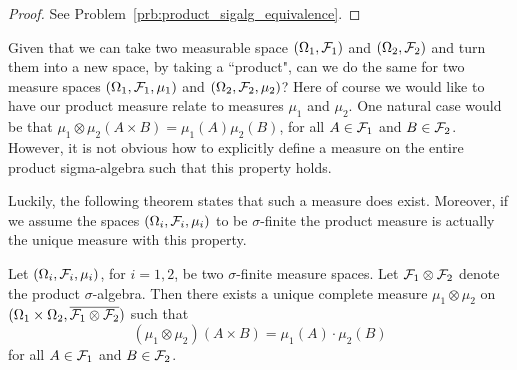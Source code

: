 \begin{proof}
See Problem~\ref{prb:product_sigalg_equivalence}.
\end{proof}


Given that we can take two measurable space $(\Omega_1, \mathcal F_1)$ and $(\Omega_2, \mathcal F_2)$ and turn them into a new space, by taking a ``product", can we do the same for two measure spaces $(\Omega_1, \mathcal F_1, \mu_1)$ and $(\Omega_2, \mathcal F_2, \mu_2)$? Here of course we would like to have our product measure relate to measures $\mu_1$ and $\mu_2$. One natural case would be that $\mu_1 \otimes \mu_2 (A \times B) =\mu_1(A) \mu_2(B)$, for all $A \in \mathcal F_1$ and $B \in \mathcal F_2$. However, it is not obvious how to explicitly define a measure on the entire product sigma-algebra such that this property holds.  

Luckily, the following theorem states that such a measure does exist. Moreover, if we assume the spaces $(\Omega_i, \mathcal F_i, \mu_i)$ to be $\sigma$-finite the product measure is actually the unique measure with this property. 


\begin{theorem}
	\label{th:construction-product-measure}
	Let $(\Omega_i, \mathcal F_i, \mu_i)$, for $i = 1, 2$,  be two $\sigma$-finite measure spaces. Let $\mathcal F_1 \otimes \mathcal F_2$ denote the product $\sigma$-algebra. 
	Then there exists a unique complete measure $\mu_1 \otimes \mu_2$ on 
	$(\Omega_1 \times \Omega_2, \overline{\mathcal F_1 \otimes \mathcal F_2})$ such that 
	\[
	(\mu_1 \otimes \mu_2)(A \times B ) = \mu_1(A) \cdot \mu_2(B)
	\]
	for all $A \in \mathcal F_1$ and $B \in \mathcal F_2$.
\end{theorem}

